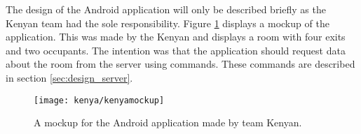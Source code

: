 The design of the Android application will only be described briefly as the Kenyan team had the sole responsibility. Figure \ref{fig:mock} displays a mockup of the application. This was made by the Kenyan and displays a room with four exits and two occupants. The intention was that the application should request data about the room from the server using commands. These commands are described in section \ref{sec:design_server}.
\begin{figure}
\centering
\texttt{[image: kenya/kenyamockup]}
\caption{A mockup for the Android application made by team Kenyan.}
\label{fig:mock}
\end{figure}